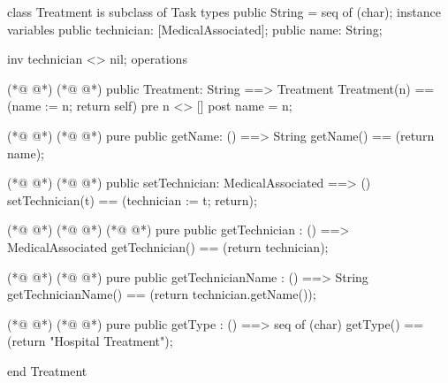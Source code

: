 \begin{vdmpp}[breaklines=true]
class Treatment is subclass of Task
types
 public String = seq of (char);
instance variables
  public technician: [MedicalAssociated];
  public name: String;
  
  inv technician <> nil;
operations

(*@
\label{HospitalTreatment:11}
@*)
(*@
\label{HospitalTreatment:11}
@*)
 public Treatment: String ==> Treatment
  Treatment(n) == (name := n; return self)
 pre n <> []
 post name = n;
 
(*@
\label{getName:16}
@*)
(*@
\label{getName:16}
@*)
 pure public getName: () ==> String
  getName() == (return name);
  
(*@
\label{setTechnician:19}
@*)
(*@
\label{setTechnician:19}
@*)
 public setTechnician: MedicalAssociated ==> ()
  setTechnician(t) == (technician := t; return);
 
(*@
\label{getTechnician:22}
@*)
(*@
\label{getTechnician:22}
@*)
(*@
\label{Treatment:22}
@*)
 pure public getTechnician : () ==> MedicalAssociated
  getTechnician() == (return technician);
  
(*@
\label{getTechnicianName:25}
@*)
(*@
\label{getTechnicianName:25}
@*)
 pure public getTechnicianName : () ==> String
  getTechnicianName() == (return technician.getName());
 
(*@
\label{getType:28}
@*)
(*@
\label{getType:28}
@*)
 pure public getType : () ==> seq of (char) 
  getType() == (return "Hospital Treatment");

end Treatment
\end{vdmpp}
